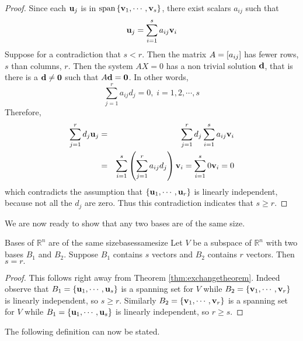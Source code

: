 \begin{proof}
Since each ${\bf u}_j$ is in $\mbox{span}\left\{ {\bf v}_{1},\cdots ,{\bf v}_{s}\right\} 
$, there exist scalars $a_{ij}$ such that 
\begin{equation*}
{\bf u}_{j}=\sum_{i=1}^{s}a_{ij}{\bf v}_{i}
\end{equation*}
Suppose for a contradiction that $s<r$. Then the matrix $A = \left[
a_{ij} \right]$ has fewer rows, $s$ than columns, $r$. Then the system
$AX=0$ has %
a non trivial solution ${\bf d}$, that is there is a  ${\bf d}\neq {\bf 0}$ such that  $A{\bf d}={\bf 0}$. In other
words, 
\begin{equation*}
\sum_{j=1}^{r}a_{ij}d_{j}=0,\;i=1,2,\cdots ,s
\end{equation*}
Therefore, 
\begin{eqnarray*}
\sum_{j=1}^{r}d_{j}{\bf u}_{j} &=&\sum_{j=1}^{r}d_{j}\sum_{i=1}^{s}a_{ij}
{\bf v}_{i} \\
&=&\sum_{i=1}^{s}\left( \sum_{j=1}^{r}a_{ij}d_{j}\right) {\bf v}
_{i}=\sum_{i=1}^{s}0{\bf v}_{i}=0
\end{eqnarray*}
which contradicts the assumption that $\left\{ {\bf u}_{1},\cdots ,{\bf u}_{r}\right\} $
is linearly independent, because not all the $d_{j}$ are zero. Thus this contradiction indicates that $s\geq r$. 
\end{proof}

We are now ready to show that any two bases are of the same size. 

\begin{theorem}{Bases of $\mathbb{R}^{n}$ are of the same size}{basessamesize}
Let $V$ be a subspace of $\mathbb{R}^{n}$ with two bases $B_1$ and $B_2$. Suppose $B_1$ contains $s$ vectors and $B_2$ contains $r$ vectors. Then $s=r.$
\end{theorem}

\begin{proof}
This follows right away from Theorem \ref{thm:exchangetheorem}. Indeed
observe that $B_1 = \left\{
{\bf u}_{1},\cdots ,{\bf u}_{s}\right\} $ is a spanning set for $V$ while $
B_2 = \left\{ {\bf v}_{1},\cdots ,{\bf v}_{r}\right\} $ is linearly
independent, so $s \geq r.$ Similarly $B_2 = \left\{ {\bf v}_{1},\cdots ,{\bf v}
_{r}\right\} $ is a spanning set for $V$ while $B_1 = \left\{ {\bf u}_{1},\cdots ,
{\bf u}_{s}\right\} $ is linearly independent,  so $r\geq s$.
\end{proof}

The following definition can now be stated.

